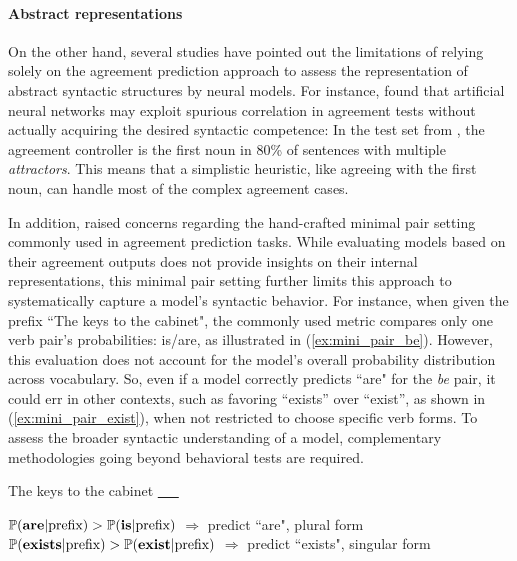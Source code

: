   
\paragraph{Abstract representations} On the other hand, several studies have pointed out the limitations of relying solely on the agreement prediction approach to assess the representation of abstract syntactic structures by neural models. For instance, \cite{kuncoro2018perils} found that artificial neural networks may exploit spurious correlation in agreement tests without actually acquiring the desired syntactic competence: In the test set from \cite{linzen-etal-2016-assessing}, the agreement controller is the first noun in 80\% of sentences with multiple \textit{attractors}. This means that a simplistic heuristic, like agreeing with the first noun, can handle most of the complex agreement cases.

In addition, \cite{newman-etal-2021-refining} raised concerns regarding the hand-crafted minimal pair setting commonly used in agreement prediction tasks. While evaluating models based on their agreement outputs does not provide insights on their internal representations, this minimal pair setting further limits this approach to systematically capture a model's syntactic behavior. For instance, when given the prefix ``The keys to the cabinet", the commonly used metric compares only one verb pair's probabilities: is/are, as illustrated in (\ref{ex:mini_pair_be}). However, this evaluation does not account for the model's overall probability distribution across vocabulary. So, even if a model correctly predicts ``are" for the \textit{be} pair, it could err in other contexts, such as favoring ``exists'' over ``exist'', as shown in (\ref{ex:mini_pair_exist}), when not restricted to choose specific verb forms. To assess the broader syntactic understanding of a model, complementary methodologies going beyond behavioral tests are required.

\vspace{-0.5\baselineskip}
\begin{exe}
   \ex\label{ex:mini_pair}
The keys to the cabinet \underline{\ \ \ }   \\
\begin{xlist}
    \vspace{-2ex}
    \ex \label{ex:mini_pair_be} $\mathbb{P}(\textrm{\bf are}|\textrm{prefix}) >
      \mathbb{P}(\textrm{\bf is}|\textrm{prefix})$ $\Rightarrow$ predict ``are", plural form \\
      \vspace{-2ex}
    \ex \label{ex:mini_pair_exist} $\mathbb{P}(\textrm{\bf exists}|\textrm{prefix}) >
      \mathbb{P}(\textrm{\bf exist}|\textrm{prefix})$ $\Rightarrow$ predict ``exists", singular form 
      \end{xlist}
\end{exe}
\vspace{-0.5\baselineskip}

